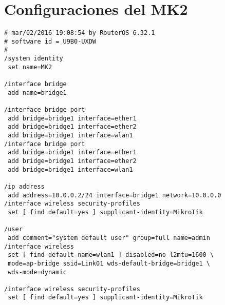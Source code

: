 \section{Configuraciones del MK2}
\begin{verbatim}
# mar/02/2016 19:08:54 by RouterOS 6.32.1
# software id = U9B0-UXDW
#
/system identity
 set name=MK2
 
/interface bridge
 add name=bridge1
 
/interface bridge port
 add bridge=bridge1 interface=ether1
 add bridge=bridge1 interface=ether2
 add bridge=bridge1 interface=wlan1
/interface bridge port
 add bridge=bridge1 interface=ether1
 add bridge=bridge1 interface=ether2
 add bridge=bridge1 interface=wlan1
 
/ip address
 add address=10.0.0.2/24 interface=bridge1 network=10.0.0.0
/interface wireless security-profiles
 set [ find default=yes ] supplicant-identity=MikroTik
 
/user
 add comment="system default user" group=full name=admin
/interface wireless
 set [ find default-name=wlan1 ] disabled=no l2mtu=1600 \
 mode=ap-bridge ssid=Link01 wds-default-bridge=bridge1 \
 wds-mode=dynamic
 
/interface wireless security-profiles
 set [ find default=yes ] supplicant-identity=MikroTik
\end{verbatim}
